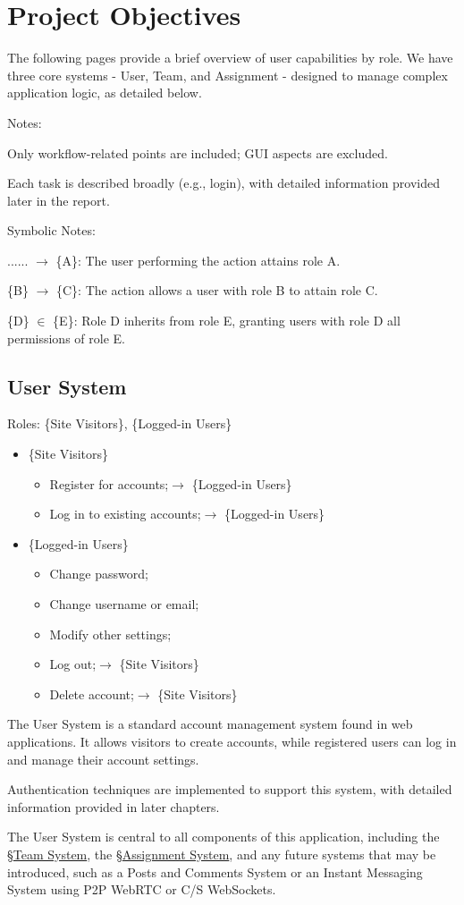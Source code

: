 \documentclass[12pt]{report}
\newcommand{\n}{\par}
\newcommand{\br}{\n\vspace{1 em}\n}
\begin{document}
\section{Project Objectives} \label{overview.project-objectives}
The following pages provide a brief overview of user capabilities by role.
We have three core systems - User, Team, and Assignment - designed to manage complex application logic, as detailed below.
\br
Notes:\n
Only workflow-related points are included; GUI aspects are excluded.\n
Each task is described broadly (e.g., login), with detailed information provided later in the report.
\br
Symbolic Notes:\n
...... $\rightarrow$ \{A\}: The user performing the action attains role A.\n
\{B\} $\rightarrow$ \{C\}: The action allows a user with role B to attain role C.\n
\{D\} $\in$ \{E\}: Role D inherits from role E, granting users with role D all permissions of role E.


\subsection{User System} \label{overview.project-objectives.user-system}
Roles: \{Site Visitors\}, \{Logged-in Users\}\n
\begin{itemize}
	\item \{Site Visitors\}
	      \begin{itemize}
		      \item Register for accounts;\null\hfill $\rightarrow$ \{Logged-in Users\}
		      \item Log in to existing accounts;\null\hfill $\rightarrow$ \{Logged-in Users\}
	      \end{itemize}
	\item \{Logged-in Users\}
	      \begin{itemize}
		      \item Change password;
		      \item Change username or email;
		      \item Modify other settings;
		      \item Log out;\null\hfill $\rightarrow$ \{Site Visitors\}
		      \item Delete account;\null\hfill $\rightarrow$ \{Site Visitors\}
	      \end{itemize}
\end{itemize}\n
The User System is a standard account management system found in web applications.
It allows visitors to create accounts, while registered users can log in and manage their account settings.
\br
Authentication techniques are implemented to support this system, with detailed information provided in later chapters.
\br
The User System is central to all components of this application,
including the \S \hyperref[overview.project-objectives.team-system]{Team System},
the \S \hyperref[overview.project-objectives.assignment-system]{Assignment System},
and any future systems that may be introduced,
such as a Posts and Comments System or an Instant Messaging System using P2P WebRTC or C/S WebSockets.
\end{document}
